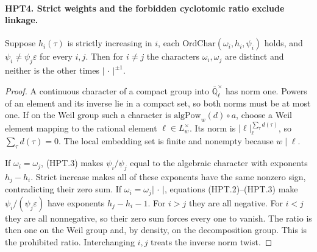 \documentclass[11pt,a4paper]{article}
\numberwithin{equation}{section}
\theoremstyle{remark}\newtheorem{remark}[theorem]{Remark}
\begin{document}
\paragraph{HPT4. Strict weights and the forbidden cyclotomic ratio exclude linkage.}
\label{claim:HPT4}
Suppose $h_i(\tau)$ is strictly increasing in $i$, each
$\mathrm{OrdChar}(\omega_i,h_i,\psi_i)$ holds, and
$\psi_i\ne\psi_j\varepsilon$ for every $i,j$.
Then for $i\ne j$ the characters $\omega_i,\omega_j$ are distinct
and neither is the other times $|\,\cdot\,|^{\pm1}$.
\begin{proof}
A continuous character of a compact group into
$\overline{\mathbb Q}_\ell^\times$ has norm one.  Powers of an
element and its inverse lie in a compact set, so both norms must
be at most one.  If on the Weil group such a character is
$\mathrm{algPow}_w(d)\circ a$, choose a Weil element mapping to
the rational element $\ell\in L_w^\times$.  Its norm is
$|\ell|_\ell^{\sum_\tau d(\tau)}$, so
$\sum_\tau d(\tau)=0$.  The local embedding set is finite and
nonempty because $w\mid\ell$.

If $\omega_i=\omega_j$, (HPT.3) makes $\psi_i/\psi_j$ equal to
the algebraic character with exponents $h_j-h_i$.  Strict increase
makes all of these exponents have the same nonzero sign, contradicting
their zero sum.  If $\omega_i=\omega_j|\,\cdot\,|$, equations
(HPT.2)--(HPT.3) make $\psi_i/(\psi_j\varepsilon)$ have exponents
$h_j-h_i-1$.  For $i>j$ they are all negative.  For $i<j$ they are
all nonnegative, so their zero sum forces every one to vanish.
The ratio is then one on the Weil group and, by density, on the
decomposition group.  This is the prohibited ratio.  Interchanging
$i,j$ treats the inverse norm twist.
\end{proof}

\end{document}
